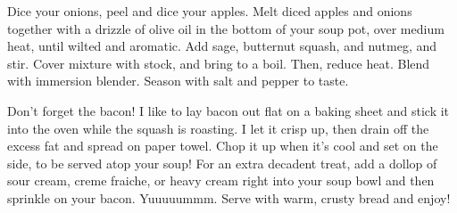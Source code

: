 Dice your onions, peel and dice your apples. Melt diced apples and onions
together with a drizzle of olive oil in the bottom of your soup pot, over medium
heat, until wilted and aromatic. Add sage, butternut squash, and nutmeg, and
stir. Cover mixture with stock, and bring to a boil. Then, reduce heat. Blend
with immersion blender. Season with salt and pepper to taste.

Don't forget the bacon! I like to lay bacon out flat on a baking sheet and stick
it into the oven while the squash is roasting. I let it crisp up, then drain off
the excess fat and spread on paper towel. Chop it up when it's cool and set on
the side, to be served atop your soup! For an extra decadent treat, add a dollop
of sour cream, creme fraiche, or heavy cream right into your soup bowl and then
sprinkle on your bacon. Yuuuuummm. Serve with warm, crusty bread and enjoy!